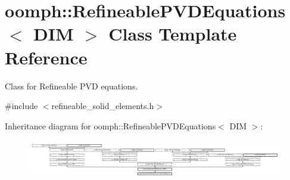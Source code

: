 \hypertarget{classoomph_1_1RefineablePVDEquations}{}\section{oomph\+:\+:Refineable\+P\+V\+D\+Equations$<$ D\+IM $>$ Class Template Reference}
\label{classoomph_1_1RefineablePVDEquations}


Class for Refineable P\+VD equations.  




{\ttfamily \#include $<$refineable\+\_\+solid\+\_\+elements.\+h$>$}

Inheritance diagram for oomph\+:\+:Refineable\+P\+V\+D\+Equations$<$ D\+IM $>$\+:\begin{figure}[H]
\begin{center}
\leavevmode
\includegraphics[height=1.712538cm]{classoomph_1_1RefineablePVDEquations}
\end{center}
\end{figure}
